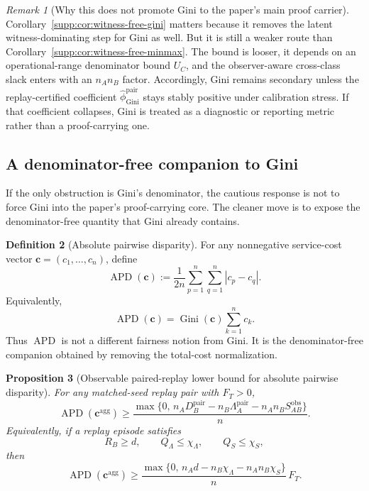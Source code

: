 \documentclass[11pt]{article}
\newcommand{\1}{\mathbf{1}}
\newcommand{\Gini}{\operatorname{Gini}}
\newcommand{\APD}{\operatorname{APD}}
\theoremstyle{definition}
\newtheorem{definition}{Definition}[section]
\theoremstyle{plain}
\newtheorem{proposition}[definition]{Proposition}
\theoremstyle{remark}
\newtheorem{remark}[definition]{Remark}
\begin{document}
\begin{remark}[Why this does not promote Gini to the paper's main proof carrier]
\label{supp:rem:witness-free-gini-caution}
Corollary~\ref{supp:cor:witness-free-gini} matters because it removes the latent witness-dominating step for Gini as well. But it is still a weaker route than Corollary~\ref{supp:cor:witness-free-minmax}. The bound is looser, it depends on an operational-range denominator bound $U_C$, and the observer-aware cross-class slack enters with an $n_A n_B$ factor. Accordingly, Gini remains secondary unless the replay-certified coefficient $\widehat\phi_{\Gini}^{\mathrm{pair}}$ stays stably positive under calibration stress. If that coefficient collapses, Gini is treated as a diagnostic or reporting metric rather than a proof-carrying one.
\end{remark}

\subsection{A denominator-free companion to Gini}
\label{supp:subsec:apd-companion}

If the only obstruction is Gini's denominator, the cautious response is not to force Gini into the paper's proof-carrying core. The cleaner move is to expose the denominator-free quantity that Gini already contains.

\begin{definition}[Absolute pairwise disparity]
\label{supp:def:apd}
For any nonnegative service-cost vector $\mathbf c=(c_1,\dots,c_n)$, define
\[
\APD(\mathbf c)
:=
\frac{1}{2n}\sum_{p=1}^n\sum_{q=1}^n |c_p-c_q|.
\]
Equivalently,
\[
\APD(\mathbf c)=\Gini(\mathbf c)\sum_{k=1}^n c_k.
\]
Thus $\APD$ is not a different fairness notion from Gini. It is the denominator-free companion obtained by removing the total-cost normalization.
\end{definition}

\begin{proposition}[Observable paired-replay lower bound for absolute pairwise disparity]
\label{supp:prop:paired-apd}
For any matched-seed replay pair with $F_T>0$,
\[
\APD(\mathbf c^{\mathrm{agg}})
\ge
\frac{\max\{0,\,
 n_A D_B^{\mathrm{pair}}
 - n_B \Lambda_A^{\mathrm{pair}}
 - n_A n_B S_{AB}^{\mathrm{obs}}
\}}{n}.
\]
Equivalently, if a replay episode satisfies
\[
R_B \ge d,
\qquad
Q_\Lambda \le \chi_\Lambda,
\qquad
Q_S \le \chi_S,
\]
then
\[
\APD(\mathbf c^{\mathrm{agg}})
\ge
\frac{\max\{0,\,
 n_A d - n_B \chi_\Lambda - n_A n_B \chi_S
\}}{n}\,F_T.
\]
\end{proposition}
\end{document}
